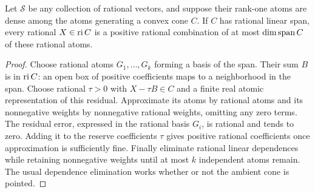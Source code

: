 \begin{lemma}\label{lem:reserve}
Let $\mathcal S$ be any collection of rational vectors, and suppose their rank-one atoms are dense among the atoms generating a convex cone $C$. If $C$ has rational linear span, every rational $X\in\operatorname{ri} C$ is a positive rational combination of at most $\dim\operatorname{span} C$ of these rational atoms.
\end{lemma}
\begin{proof}
Choose rational atoms $G_1,\ldots,G_k$ forming a basis of the span. Their sum $B$ is in $\operatorname{ri} C$: an open box of positive coefficients maps to a neighborhood in the span. Choose rational $\tau>0$ with $X-\tau B\in C$ and a finite real atomic representation of this residual. Approximate its atoms by rational atoms and its nonnegative weights by nonnegative rational weights, omitting any zero terms. The residual error, expressed in the rational basis $G_i$, is rational and tends to zero. Adding it to the reserve coefficients $\tau$ gives positive rational coefficients once approximation is sufficiently fine. Finally eliminate rational linear dependences while retaining nonnegative weights until at most $k$ independent atoms remain. The usual dependence elimination works whether or not the ambient cone is pointed.
\end{proof}

